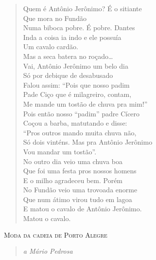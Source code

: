 \begin{verse}
Quem é Antônio Jerônimo? É o sitiante\\
\quad\quad{}Que mora no Fundão\\
Numa biboca pobre. É pobre. Dantes\\
Inda a coisa ia indo e ele possuía\\
\quad\quad{}Um cavalo cardão.\\
Mas a seca batera no roçado\ldots{}\\
Vai, Antônio Jerônimo um belo dia\\
Só por debique de desabusado\\
Falou assim: ``Pois que nosso padim\\
Pade Ciço que é milagreiro, contam,\\
Me mande um tostão de chuva pra mim!''\\
Pois então nosso ``padim'' padre Cícero\\
Coçou a barba, matutando e disse:\\
``Pros outros mando muita chuva não,\\
Só dois vinténs. Mas pra Antônio Jerônimo\\
\quad\quad{}Vou mandar um tostão''.\\
No outro dia veio uma chuva boa\\
Que foi uma festa pros nossos homens\\
E o milho agradeceu bem. Porém\\
No Fundão veio uma trovoada enorme\\
Que num átimo virou tudo em lagoa\\
E matou o cavalo de Antônio Jerônimo.\\
\quad\quad{}Matou o cavalo.
\end{verse}

\textsc{Moda da cadeia de Porto Alegre}

\begin{quote}
\emph{a Mário Pedrosa}
\end{quote}

